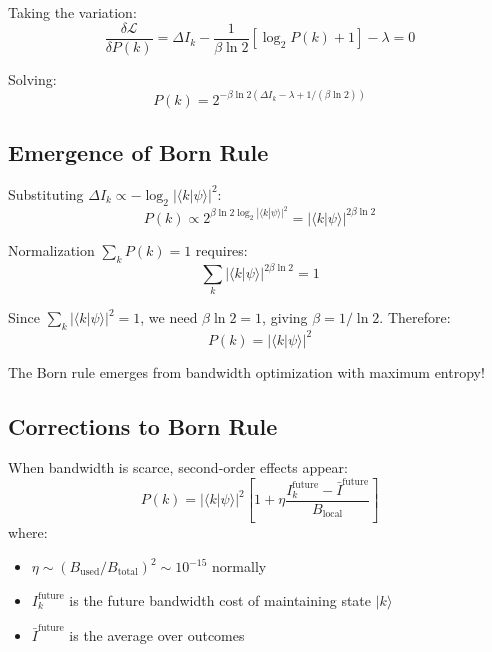 \documentclass[twocolumn,prd,amsmath,amssymb,aps,superscriptaddress,nofootinbib]{revtex4-2}
\begin{document}
Taking the variation:
\begin{equation}
\frac{\delta\mathcal{L}}{\delta P(k)} = \Delta I_k - \frac{1}{\beta \ln 2}[\log_2 P(k) + 1] - \lambda = 0
\end{equation}

Solving:
\begin{equation}
P(k) = 2^{-\beta \ln 2 (\Delta I_k - \lambda + 1/(\beta \ln 2))}
\end{equation}

\subsection{Emergence of Born Rule}

Substituting $\Delta I_k \propto -\log_2|\langle k|\psi\rangle|^2$:
\begin{equation}
P(k) \propto 2^{\beta \ln 2 \log_2|\langle k|\psi\rangle|^2} = |\langle k|\psi\rangle|^{2\beta \ln 2}
\end{equation}

Normalization $\sum_k P(k) = 1$ requires:
\begin{equation}
\sum_k |\langle k|\psi\rangle|^{2\beta \ln 2} = 1
\end{equation}

Since $\sum_k |\langle k|\psi\rangle|^2 = 1$, we need $\beta \ln 2 = 1$, giving $\beta = 1/\ln 2$. Therefore:
\begin{equation}
\boxed{P(k) = |\langle k|\psi\rangle|^2}
\label{eq:born_rule}
\end{equation}

The Born rule emerges from bandwidth optimization with maximum entropy!

\subsection{Corrections to Born Rule}

When bandwidth is scarce, second-order effects appear:
\begin{equation}
P(k) = |\langle k|\psi\rangle|^2 \left[1 + \eta\frac{I_k^{\text{future}} - \bar{I}^{\text{future}}}{B_{\text{local}}}\right]
\label{eq:born_corrections}
\end{equation}
where:
\begin{itemize}
\item $\eta \sim (B_{\text{used}}/B_{\text{total}})^2 \sim 10^{-15}$ normally
\item $I_k^{\text{future}}$ is the future bandwidth cost of maintaining state $|k\rangle$
\item $\bar{I}^{\text{future}}$ is the average over outcomes
\end{itemize}
\end{document}
